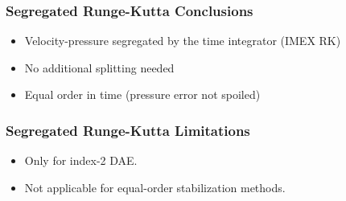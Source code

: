 \begin{frame}
\frametitle{Segregated Runge-Kutta Conclusions}
\vfill
\begin{itemize}
\item<1-> Velocity-pressure segregated by the time integrator (IMEX RK)
\item<2-> No additional splitting needed
\item<3-> Equal order in time (pressure error not spoiled)
\end{itemize}
\vfill
\end{frame}
\begin{frame}
\frametitle{Segregated Runge-Kutta Limitations}
\vfill
\begin{itemize}
\item<1-> Only for index-2 DAE. 
\item<2-> Not applicable for equal-order stabilization methods.
\end{itemize}
\vfill
\end{frame}